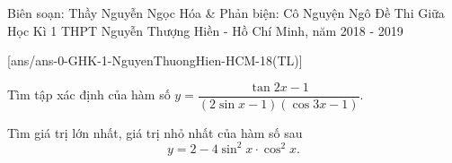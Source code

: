 \begin{name}
{Biên soạn: Thầy Nguyễn Ngọc Hóa \& Phản biện: Cô Nguyện Ngô}
{Đề Thi Giữa Học Kì 1 THPT Nguyễn Thượng Hiền - Hồ Chí Minh, năm 2018 - 2019}
\end{name}

\setcounter{ex}{0}\setcounter{bt}{0}
[ans/ans-0-GHK-1-NguyenThuongHien-HCM-18(TL)]

\begin{bt}%
	Tìm tập xác định của hàm số $y=\dfrac{\tan 2x-1}{(2\sin x-1)(\cos 3x-1)}$.
\end{bt}

\begin{bt}%
	Tìm giá trị lớn nhất, giá trị nhỏ nhất của hàm số sau
		$$y=2-4\sin ^2x\cdot \cos ^2x.$$
\end{bt}

